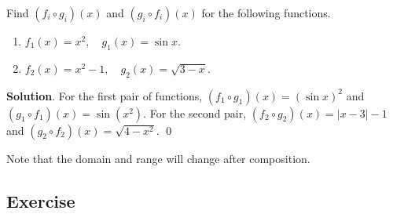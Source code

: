 \documentclass[11pt]{book}
\theoremstyle{break}
\theoremstyle{no_label}
\numberwithin{equation}{section}
\begin{document}
\begin{example}
    Find $(f_i\circ g_i)(x)$ and $(g_i\circ f_i)(x)$ for the following functions.
    \begin{enumerate}
        \item $f_1(x)=x^2, \quad g_1(x)=\sin x$.
        \item $f_2(x)=x^2-1, \quad g_2(x)=\sqrt{3-x}$.
    \end{enumerate}
\end{example}
\textbf{Solution}. For the first pair of functions, $(f_1\circ g_1)(x)=(\sin x)^2$ and $(g_1\circ f_1)(x)=\sin(x^2)$. For the second pair, $(f_2\circ g_2)(x)=|x-3|-1$ and $(g_2\circ f_2)(x)=\sqrt{4-x^2}$. \qed

Note that the domain and range will change after composition.

\subsection*{Exercise}

\setlength{\delimitershortfall}{0pt}
\end{document}
